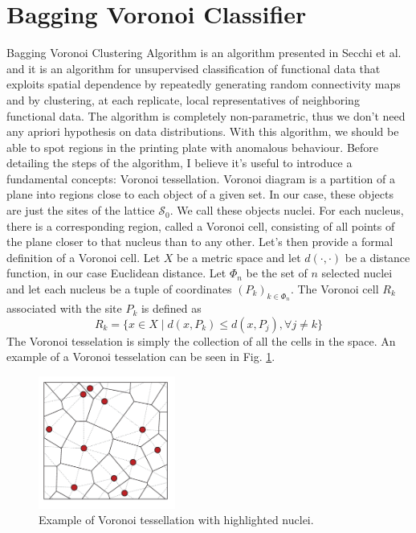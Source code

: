 \section{Bagging Voronoi Classifier}
\label{sec:bvc}
Bagging Voronoi Clustering Algorithm is an algorithm presented in Secchi et al. \cite{secchi_bagging_2013} and it is an algorithm for unsupervised classification of functional data that exploits spatial dependence by repeatedly generating random connectivity maps and by clustering, at each replicate, local representatives of neighboring functional data. The algorithm is completely non-parametric, thus we don't need any apriori hypothesis on data distributions. With this algorithm, we should be able to spot regions in the printing plate with anomalous behaviour. Before detailing the steps of the algorithm, I believe it's useful to introduce a fundamental concepts: Voronoi tessellation. Voronoi diagram is a partition of a plane into regions close to each object of a given set. In our case, these objects are just the sites of the lattice $\mathcal{S}_0$. We call these objects nuclei. For each nucleus, there is a corresponding region, called a Voronoi cell, consisting of all points of the plane closer to that nucleus than to any other. Let's then provide a formal definition of a Voronoi cell. Let $X$ be a metric space and let $d(\cdot, \cdot)$ be a distance function, in our case Euclidean distance. Let $\Phi_n$ be the set of $n$ selected nuclei and let each nucleus be a tuple of coordinates $\left(P_k\right)_{k\in \Phi_n}$. The Voronoi cell $R_k$ associated with the site $P_k$ is defined as
\begin{equation}
    \label{eq:voronoicell}
    R_k=\{x\in X \mid d(x, P_k)\leq d(x, P_j),\forall j\neq k\}
\end{equation}
The Voronoi tesselation is simply the collection of all the cells in the space.
An example of a Voronoi tesselation can be seen in Fig. \ref{fig:voronoi}.
\begin{figure}[H]
    \centering
    \includegraphics[width=0.4\textwidth]{Images/A-set-of-atoms-the-associated-Voronoi-tessellation-solid-lines-and-the-Delaunay.png}
    \caption[Voronoi tesselation.]{Example of Voronoi tessellation with highlighted nuclei.}
    \label{fig:voronoi}
\end{figure}


